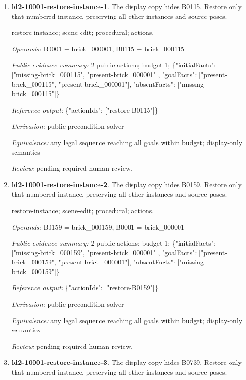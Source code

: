 \begin{enumerate}
\item \textbf{ld2-10001-restore-instance-1}. The display copy hides B0115. Restore only that numbered instance, preserving all other instances and source poses.
\par{\small restore-instance; scene-edit; procedural; actions.\par\textit{Operands:} B0001 = brick\_000001, B0115 = brick\_000115\par\textit{Public evidence summary:} 2 public actions; budget 1; \{"initialFacts": ["missing-brick\_000115", "present-brick\_000001"], "goalFacts": ["present-brick\_000115", "present-brick\_000001"], "absentFacts": ["missing-brick\_000115"]\}\par\textit{Reference output:} \{"actionIds": ["restore-B0115"]\}\par\textit{Derivation:} public precondition solver\par\textit{Equivalence:} any legal sequence reaching all goals within budget; display-only semantics\par\textit{Review:} pending required human review.}
\item \textbf{ld2-10001-restore-instance-2}. The display copy hides B0159. Restore only that numbered instance, preserving all other instances and source poses.
\par{\small restore-instance; scene-edit; procedural; actions.\par\textit{Operands:} B0159 = brick\_000159, B0001 = brick\_000001\par\textit{Public evidence summary:} 2 public actions; budget 1; \{"initialFacts": ["missing-brick\_000159", "present-brick\_000001"], "goalFacts": ["present-brick\_000159", "present-brick\_000001"], "absentFacts": ["missing-brick\_000159"]\}\par\textit{Reference output:} \{"actionIds": ["restore-B0159"]\}\par\textit{Derivation:} public precondition solver\par\textit{Equivalence:} any legal sequence reaching all goals within budget; display-only semantics\par\textit{Review:} pending required human review.}
\item \textbf{ld2-10001-restore-instance-3}. The display copy hides B0739. Restore only that numbered instance, preserving all other instances and source poses.

\end{enumerate}

